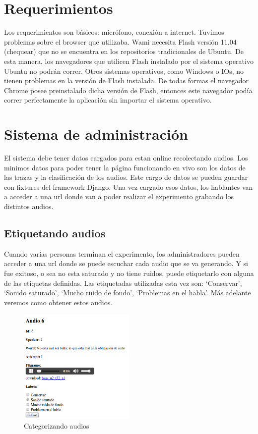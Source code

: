\documentclass[11pt,a4paper,twoside]{tesis}
\begin{document}
\section{Requerimientos}

Los requerimientos son básicos: micrófono, conexión a internet. 
Tuvimos problemas sobre el browser que utilizaba. Wami necesita Flash versión 11.04 (chequear) que no se encuentra en los repositorios tradicionales de Ubuntu. De esta manera, los navegadores que utilicen Flash instalado por el sistema operativo Ubuntu no podrán correr. Otros sistemas operativos, como Windows o IOs, no tienen problemas en la versión de Flash instalada. De todas formas el navegador Chrome posee preinstalado dicha versión de Flash, entonces este navegador podía correr perfectamente la aplicación sin importar el sistema operativo.

\section{Sistema de administración}

El sistema debe tener datos cargados para estan online recolectando audios. Los minimos datos para poder tener la página funcionando en vivo son los datos de las trazas y la clasificación de los audios. Este cargo de datos se pueden guardar con fixtures del framework Django. Una vez cargado esos datos, los hablantes van a acceder a una url donde van a poder realizar el experimento grabando los distintos audios.

\subsection{Etiquetando audios}

Cuando varias personas terminan el experimento, los administradores pueden acceder a una url donde se puede escuchar cada audio que se va generando. Y si fue exitoso, o sea no esta saturado y no tiene ruidos, puede etiquetarlo con alguna de las etiquetas definidas. Las etiquetadas utilizadas esta vez son: ‘Conservar’,  ‘Sonido saturado’, ‘Mucho ruido de fondo’, ‘Problemas en el habla’. Más adelante veremos como obtener estos audios.

\begin{figure}[h!]
    \centerline{\includegraphics[width=0.5\textwidth]{categorizando_audios} }
    \caption{Categorizando audios}
\end{figure}
\end{document}
